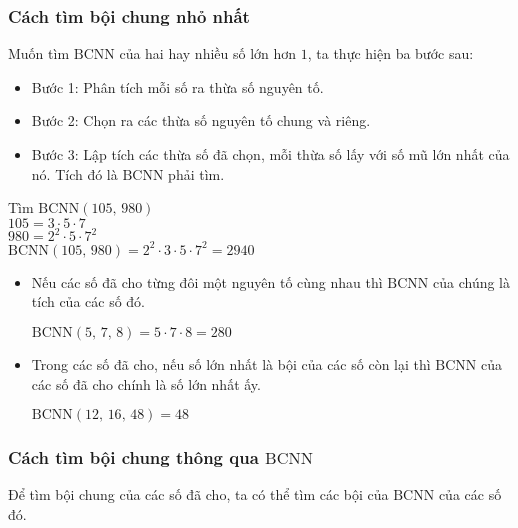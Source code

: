 \begin{tomtat}
	\subsubsection{Cách tìm bội chung nhỏ nhất}
Muốn tìm $\text{BCNN}$ của hai hay nhiều số lớn hơn $1$, ta thực hiện ba bước sau:
\begin{itemize}
\item Bước 1: Phân tích mỗi số ra thừa số nguyên tố.
\item Bước 2: Chọn ra các thừa số nguyên tố chung và riêng.
\item Bước 3: Lập tích các thừa số đã chọn, mỗi thừa số lấy với số mũ lớn nhất của nó. Tích đó là $\text{BCNN}$ phải tìm.
\end{itemize}
\begin{vd} Tìm $\text{BCNN}\left( {105,\,980} \right)$\\
$105 = 3 \cdot 5 \cdot 7$\\
$980 = 2^2 \cdot 5 \cdot 7^2$\\
$\text{BCNN}\left( {105,\,980} \right) = 2^2 \cdot 3 \cdot 5 \cdot 7^2= 2940$
\end{vd}
\begin{note}
\begin{itemize}
\item Nếu các số đã cho từng đôi một nguyên tố cùng nhau thì $\text{BCNN}$ của chúng là tích của các số đó.\\
\begin{vd} $\text{BCNN}\left( {5,\,7,\,8} \right) = 5 \cdot 7 \cdot 8 = 280$
\end{vd}
\item Trong các số đã cho, nếu số lớn nhất là bội của các số còn lại thì $\text{BCNN}$ của các số đã cho chính là số lớn nhất ấy.\\
\begin{vd} $\text{BCNN}\left( {12,\,16,\,48} \right) = 48$
\end{vd}
\end{itemize}
\end{note}
	\subsubsection{Cách tìm bội chung thông qua $\text{BCNN}$}
Để tìm bội chung của các số đã cho, ta có thể tìm các bội của $\text{BCNN}$ của các số đó. 
\end{tomtat}
